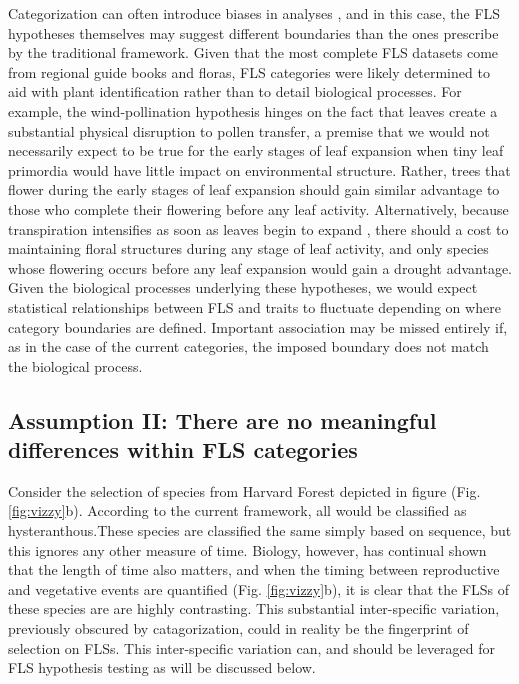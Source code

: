 \documentclass{article}
\begin{document}
{\noindent Categorization can often introduce biases in analyses \citep{}, and in this case, the FLS hypotheses themselves may suggest different boundaries than the ones prescribe by the traditional framework. Given that the most complete FLS datasets come from regional guide books and floras, FLS categories were likely determined to aid with plant identification rather than to detail biological processes. For example, the wind-pollination hypothesis hinges on the fact that leaves create a substantial physical disruption to pollen transfer, a premise that we would not necessarily expect to be true for the early stages of leaf expansion when tiny leaf primordia would have little impact on environmental structure. Rather, trees that flower during the early stages of leaf expansion should gain similar advantage to those who complete their flowering before any leaf activity. Alternatively, because transpiration intensifies as soon as leaves begin to expand \citep{Breda1996,Wang2018}, there should a cost to maintaining floral structures during any stage of leaf activity, and only species whose flowering occurs before any leaf expansion would gain a drought advantage. Given the biological processes underlying these hypotheses, we would expect statistical relationships between FLS and traits to fluctuate depending on where category boundaries are defined. Important association may be missed entirely if, as in the case of the current categories, the imposed boundary does not match the biological process.

\subsection*{Assumption II: There are no meaningful differences within FLS categories}
 Consider the selection of species from Harvard Forest depicted in figure (Fig. \ref{fig:vizzy}b). According to the current framework, all would be classified as hysteranthous.These species are classified the same simply based on sequence, but this ignores any other measure of time. Biology, however, has continual shown that the length of time also matters\citep{Inouye2019}, and when the timing between reproductive and vegetative events are quantified (Fig. \ref{fig:vizzy}b), it is clear that the FLSs of these species are are highly contrasting. This substantial inter-specific variation, previously obscured by catagorization, could in reality be the fingerprint of selection on FLSs. This inter-specific variation can, and should be leveraged for FLS hypothesis testing as will be discussed below.

}
\end{document}
